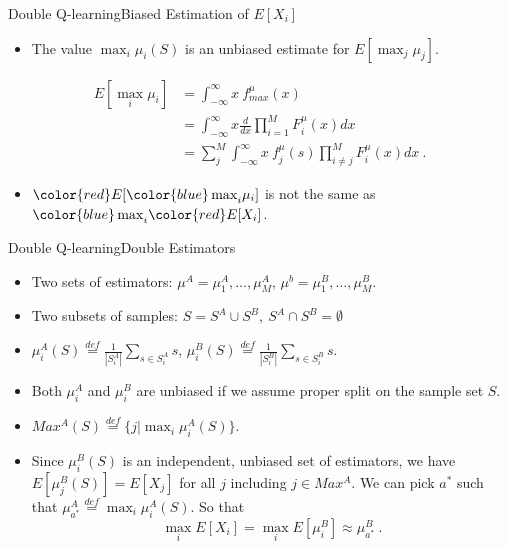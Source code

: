\documentclass{beamer}
\newcommand{\red}[1]{{\color{red} #1}}
\newcommand{\blue}[1]{{\color{blue} #1}}
\begin{document}
\begin{frame}{Double Q-learning}{Biased Estimation of $E[X_i]$}
	\begin{itemize}
		\item The value $\max_i \mu_i(S)$ is an unbiased estimate for $E[\max_j \mu_j]$.
	\end{itemize}
	\begin{equation}\label{eq:single_est}
	\begin{aligned}
		E[\max_i \mu_i] &= \int_{-\infty}^{\infty} x ~f_{max}^{\mu}(x) \\
		&= \int_{-\infty}^{\infty}x\frac{d}{dx}\prod_{i=1}^M F_i^{\mu}(x)dx \\
		&= \sum_j^M \int_{-\infty}^{\infty}x ~f_j^{\mu}(s) \prod_{i\neq j}^M F_i^{\mu}(x)dx ~.
	\end{aligned}
	\end{equation}
	\begin{itemize}
		\item $\red{E}[\blue{\max}_i \mu_i]$ is not the same as $\blue{\max}_i \red{E}[X_i]$.
	\end{itemize}
\end{frame}

\begin{frame}{Double Q-learning}{Double Estimators}
	\begin{itemize}
		\item Two sets of estimators: $\mu^A={\mu_1^A,\ldots,\mu_M^A}$, $\mu^b={\mu_1^B,\ldots,\mu_M^B}$.
		\item Two subsets of samples: $S=S^A\cup S^B,~S^A \cap S^B = \emptyset$
		\item $\mu_i^A(S) \overset{def}{=}\frac{1}{|S^A_i|}\sum_{s\in S^A_i}s$, $\mu_i^B(S) \overset{def}{=}\frac{1}{|S^B_i|}\sum_{s\in S^B_i}s$.
	\end{itemize}

	\begin{itemize}
		\item Both $\mu_i^A$ and $\mu_i^B$ are unbiased if we assume proper split on the sample set $S$.
		\item $Max^A(S) \overset{def}{=} \{ j | \max_i \mu_i^A(S)\}$.
		\item Since $\mu_i^B(S)$ is an independent, unbiased set of estimators, we have $E[\mu_j^B(S)] = E[X_j]$ for all $j$ including $j \in Max^A$. We can pick $a^*$ such that $\mu_{a^*}^A \overset{def}{=} \max_i \mu_i^A(S)$. So that
		\begin{equation}
			\max_i E[X_i] = \max_i E[\mu_i^B] \approx \mu_{a^*}^B ~.
		\end{equation}
	\end{itemize}
\end{frame}
\end{document}
